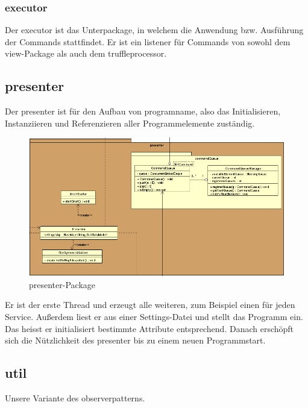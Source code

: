     \subsubsection{executor}
    Der executor ist das Unterpackage, in welchem die Anwendung bzw.
    Ausführung der Commands stattfindet. Er ist ein \gls{listener} für Commands
    von sowohl dem view-Package als auch dem truffleprocessor.


\subsection{presenter}


Der presenter ist für den Aufbau von \gls{programname}, also das
Initialisieren, Instanziieren und Referenzieren aller Programmelemente zuständig.

\begin{figure}[H]
  \centering
  \includegraphics[width=\textwidth]{../diagramimages/presenter.png}
  \caption{presenter-Package}
\end{figure}

Er ist der erste Thread und erzeugt alle weiteren, zum Beispiel einen für jeden
Service. Außerdem liest er aus einer Settings-Datei und stellt das Programm ein.
Das heisst er initialisiert bestimmte Attribute entsprechend. Danach erschöpft
sich die Nützlichkeit des presenter bis zu einem neuen Programmstart.


\subsection{util}


Unsere Variante des \gls{observerpattern}s.

